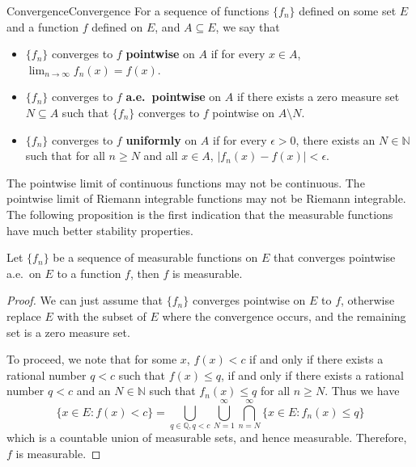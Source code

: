 \documentclass[../main.tex]{subfiles}
\begin{document}
\begin{definition}{Convergence}{Convergence}
	For a sequence of functions $\{f_n\}$ defined on some set $E$ and a function $f$ defined on $E$, and $A \subseteq E$, we say that
	\begin{itemize}
		\item $\{f_n\}$ converges to $f$ \textbf{pointwise} on $A$ if for every $x \in A$, $\lim_{n \to \infty} f_n(x) = f(x)$.
		\item $\{f_n\}$ converges to $f$ \textbf{a.e.\ pointwise} on $A$ if there exists a zero measure set $N \subseteq A$ such that $\{f_n\}$ converges to $f$ pointwise on $A \setminus N$.
		\item $\{f_n\}$ converges to $f$ \textbf{uniformly} on $A$ if for every $\epsilon > 0$, there exists an $N \in \mathbb{N}$ such that for all $n \geq N$ and all $x \in A$, $|f_n(x) - f(x)| < \epsilon$.
	\end{itemize}
\end{definition}

The pointwise limit of continuous functions may not be continuous. The pointwise limit of Riemann integrable functions may not be Riemann integrable. The following proposition is the first indication that the measurable functions have much better stability properties.

\begin{proposition}{}{}
	Let $\{f_n\}$ be a sequence of measurable functions on $E$ that converges pointwise a.e.\ on $E$ to a function $f$, then $f$ is measurable.
\end{proposition}
\begin{proof}
	We can just assume that $\{f_n\}$ converges pointwise on $E$ to $f$, otherwise replace $E$ with the subset of $E$ where the convergence occurs, and the remaining set is a zero measure set.

	To proceed, we note that for some $x$, $f(x) < c$ if and only if there exists a rational number $q < c$ such that $f(x) \leq q$, if and only if there exists a rational number $q < c$ and an $N \in \mathbb{N}$ such that $f_n(x) \leq q$ for all $n \geq N$. Thus we have
	\begin{equation*}
		\{x \in E : f(x) < c\} = \bigcup_{q \in \mathbb{Q}, q < c} \bigcup_{N=1}^{\infty} \bigcap_{n=N}^{\infty} \{x \in E : f_n(x) \leq q\}
	\end{equation*}
	which is a countable union of measurable sets, and hence measurable. Therefore, $f$ is measurable.
\end{proof}
\end{document}
